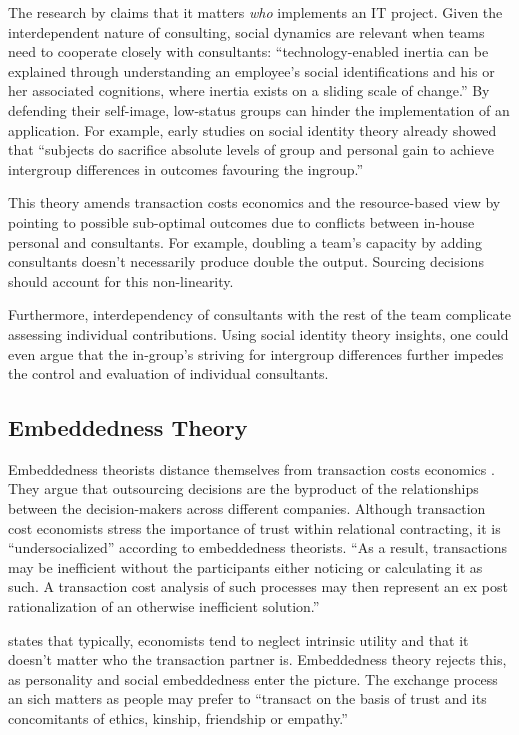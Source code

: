 \documentclass[12pt]{article}
\begin{document}
The research by \citet[311-313]{schwarz2005} claims that it matters
\emph{who} implements an IT project. Given the interdependent nature of
consulting, social dynamics are relevant when teams need to cooperate
closely with consultants: ``technology-enabled inertia can be explained
through understanding an employee's social identifications and his or
her associated cognitions, where inertia exists on a sliding scale of
change.'' By defending their self-image, low-status groups can hinder
the implementation of an application. For example, early studies on
social identity theory already showed that ``subjects do sacrifice
absolute levels of group and personal gain to achieve intergroup
differences in outcomes favouring the ingroup.'' \citep[
200]{turner1979}

This theory amends transaction costs economics and the resource-based
view by pointing to possible sub-optimal outcomes due to conflicts
between in-house personal and consultants. For example, doubling a
team's capacity by adding consultants doesn't necessarily produce double
the output. Sourcing decisions should account for this non-linearity.

Furthermore, interdependency of consultants with the rest of the team
complicate assessing individual contributions. Using social identity
theory insights, one could even argue that the in-group's striving for
intergroup differences further impedes the control and evaluation of
individual consultants.

\subsection{Embeddedness Theory}\label{embeddedness-theory}

Embeddedness theorists distance themselves from transaction costs
economics \citep[ 14-16]{armbruster2006}. They argue that outsourcing
decisions are the byproduct of the relationships between the
decision-makers across different companies. Although transaction cost
economists stress the importance of trust within relational contracting,
it is ``undersocialized'' \citep{granovetter1985} according to
embeddedness theorists. ``As a result, transactions may be inefficient
without the participants either noticing or calculating it as such. A
transaction cost analysis of such processes may then represent an ex
post rationalization of an otherwise inefficient solution.'' \citep[
15]{armbruster2006}

\citet[992]{nooteboom1996} states that typically, economists tend to
neglect intrinsic utility and that it doesn't matter who the transaction
partner is. Embeddedness theory rejects this, as personality and social
embeddedness enter the picture. The exchange process an sich matters as
people may prefer to ``transact on the basis of trust and its
concomitants of ethics, kinship, friendship or empathy.''
\end{document}
